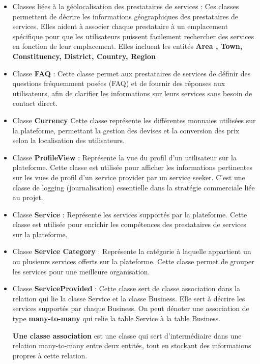 {\begin{itemize}
    \item Classes liées à la géolocalisation des prestataires de services : Ces classes permettent de décrire les informations géographiques des prestataires de services. Elles aident à associer chaque prestataire à un emplacement spécifique pour que les utilisateurs puissent facilement rechercher des services en fonction de leur emplacement.
    Elles incluent les entités \textbf{Area , Town, Constituency, District, Country, Region}
    \item Classe \textbf{FAQ} : Cette classe permet aux prestataires de services de définir des questions fréquemment posées (FAQ) et de fournir des réponses aux utilisateurs, afin de clarifier les informations sur leurs services sans besoin de contact direct.
    \item Classe \textbf{Currency} Cette classe représente les différentes monnaies utilisées sur la plateforme, permettant la gestion des devises et la conversion des prix selon la localisation des utilisateurs.

    \item Classe \textbf{ProfileView} : Représente la vue du profil d'un utilisateur sur la plateforme. Cette classe est utilisée pour afficher les informations pertinentes sur les vues de profil d'un service provider par un service seeker. C'est une classe de logging (journalisation) essentielle dans la stratégie commerciale liée au projet.

    \item Classe \textbf{Service} : Représente les services supportés par la plateforme. Cette classe est utilisée pour enrichir les compétences des prestataires de services sur la plateforme. 

    \item Classe \textbf{Service Category} : Représente la catégorie à laquelle appartient un ou plusieurs services offerts sur la plateforme. Cette classe permet de grouper les services pour une meilleure organisation.

    \item Classe \textbf{ServiceProvided} : Cette classe sert de classe association dans la relation qui lie la classe Service et la classe Business. Elle sert à décrire les services supportés par chaque Business. On peut dénoter une association de type \textbf{many-to-many} qui relie la table Service à la table Business. 
    
    \textbf{Une classe association} est une classe qui sert d’intermédiaire dans une relation many-to-many entre deux entités, tout en stockant des informations propres à cette relation.
    

\end{itemize}}

